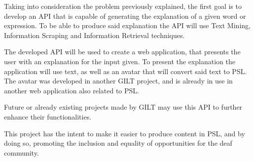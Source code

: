 Taking into consideration the problem previously explained, the first goal is to develop an \gls{API} that is capable of generating the explanation of a given word or expression.
To be able to produce said explanation the \gls{API} will use Text Mining, Information Scraping and Information Retrieval techniques.

The developed \gls{API} will be used to create a web application, that presents the user with an explanation for the input given.
To present the explanation the application will use text, as well as an avatar that will convert said text to \gls{PSL}.
The avatar was developed in another GILT project, and is already in use in another web application also related to \gls{PSL}.

Future or already existing projects made by GILT may use this \gls{API} to further enhance their functionalities.

This project has the intent to make it easier to produce content in \gls{PSL}, and by doing so, promoting the inclusion and equality of opportunities for the deaf community.
